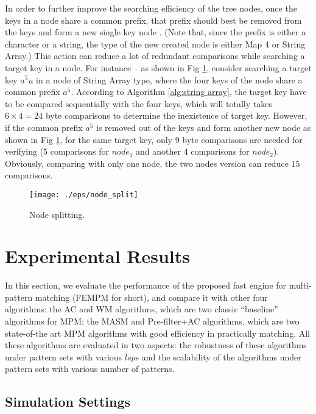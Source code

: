 In order to further improve the searching efficiency of the tree
nodes, once the keys in a node share a common prefix, that prefix
should best be removed from the keys and form a new single key node
. (Note that, since the prefix is either a character or a string, the
type of the new created node is either Map 4 or String Array.)  This
action can reduce a lot of redundant comparisons while searching a
target key in a node. For instance -- as shown in Fig \ref{fig:split},
consider searching a target key $a^5u$ in a node of String Array type,
where the four keys of the node share a common prefix $a^5$. According
to Algorithm \ref{alg:string array}, the target key have to be
compared sequentially with the four keys, which will totally takes
$6 \times 4 = 24$ byte comparisons to determine the inexistence of
target key. However, if the common prefix $a^5$ is removed out of the
keys and form another new node as shown in Fig \ref{fig:split}, for
the same target key, only 9 byte comparisons are needed for verifying
(5 comparisons for $node_1$ and another 4 comparisons for
$node_2$). Obviously, comparing with only one node, the two nodes
version can reduce 15 comparisons.

\begin{figure}[htbp]
  \centering
  \texttt{[image: ./eps/node\_split]}
  \caption{Node splitting.}
  \label{fig:split}
\end{figure}



\section{Experimental Results}
\label{sec:experiments}

In this section, we evaluate the performance of the proposed fast
engine for multi-pattern matching (\textsf{FEMPM} for short), and
compare it with other four algorithms: the \textsf{AC} and \textsf{WM}
algorithms, which are two classic ``baseline'' algorithms for MPM; the
\textsf{MASM} and \textsf{Pre-filter+AC} algorithms, which are two
state-of-the art MPM algorithms with good efficiency in practically
matching. All these algorithms are evaluated in two aspects: the
robustness of these algorithms under pattern sets with various $lsp$s
and the scalability of the algorithms under pattern sets with various
number of patterns.

\subsection{Simulation Settings}



